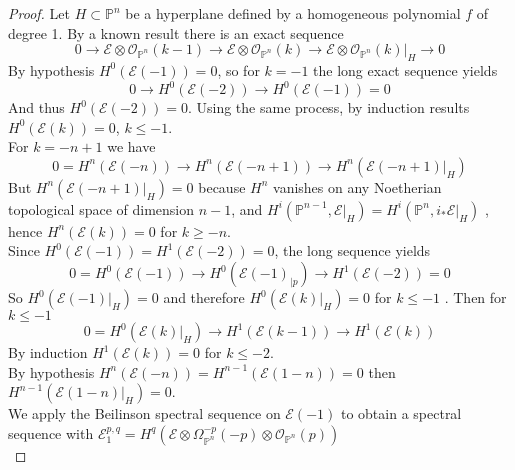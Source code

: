 \documentclass[
	oldfontcommands,
	sumario=abnt-6027-2012,
	12pt,			%
	openright,		%
	oneside,		%
	a4paper,		%
	english,		%
	brazil			%
	]{imecc-unicamp}
\begin{document}
\begin{proof}
Let $H \subset \mathbb{P}^n$ be a hyperplane defined by a homogeneous polynomial $f$ of degree 1.
By a known result \cite[Stacks Project \href{http://stacks.math.columbia.edu/tag/08A0}{Lemma 08A0}]{stacks-project} there is an exact sequence
\begin{equation}
0 \to \mathcal{E} \otimes \mathcal{O}_{\mathbb{P}^n}(k-1) \to \mathcal{E} \otimes \mathcal{O}_{\mathbb{P}^n}(k) \to \mathcal{E} \otimes \mathcal{O}_{\mathbb{P}^n}(k)|_H \to 0
\end{equation}
By hypothesis $H^0(\mathcal{E}(-1))=0$, so for $k=-1$ the long exact sequence yields
\begin{equation}
0 \to H^0(\mathcal{E}(-2)) \to H^0(\mathcal{E}(-1))=0
\end{equation}
And thus $H^0(\mathcal{E}(-2))=0$. Using the same process, by induction results \\ $H^0(\mathcal{E}(k))=0$, $k \leq -1$. \\
For $k=-n+1$ we have
\begin{equation}
0=H^n(\mathcal{E}(-n)) \to H^n(\mathcal{E}(-n+1)) \to H^n(\mathcal{E}(-n+1)|_H)
\end{equation} 
But $H^n(\mathcal{E}(-n+1)|_H)=0$ because $H^n$ vanishes on any Noetherian topological space of dimension $n-1$, and $H^i(\mathbb{P}^{n-1},\mathcal{E}|_H) = H^i(\mathbb{P}^n,i_{*}\mathcal{E}|_H)$ \cite[Hartshorne, Lemma III.2.10]{hartshorne_2010}, hence $H^n(\mathcal{E}(k))=0$ for $k \geq -n$. \\
Since $H^0(\mathcal{E}(-1))=H^1(\mathcal{E}(-2))=0$, the long sequence yields
\begin{equation}
0=H^0(\mathcal{E}(-1)) \to H^0(\mathcal{E}(-1)_{|p}) \to H^1(\mathcal{E}(-2))=0
\end{equation}
So $H^0(\mathcal{E}(-1)|_H)=0$ and therefore $H^0(\mathcal{E}(k)|_H)=0$ for $k \leq -1$ . Then for $k \leq -1$
\begin{equation}
0=H^0(\mathcal{E}(k)|_H) \to H^1(\mathcal{E}(k-1)) \to H^1(\mathcal{E}(k))
\end{equation}
By induction $H^1(\mathcal{E}(k))=0$ for $k \leq -2$. \\
By hypothesis $H^n(\mathcal{E}(-n))=H^{n-1}(\mathcal{E}(1-n))=0$ then $H^{n-1}(\mathcal{E}(1-n)|_H)=0$. \\
We apply the Beilinson spectral sequence on $\mathcal{E}(-1)$ to obtain a spectral sequence with
$\mathcal{E}^{p,q}_1=H^q(\mathcal{E} \otimes \Omega^{-p}_{\mathbb{P}^n}(-p) \otimes \mathcal{O}_{\mathbb{P}^n}(p) )$ \\

\end{proof}
\end{document}
